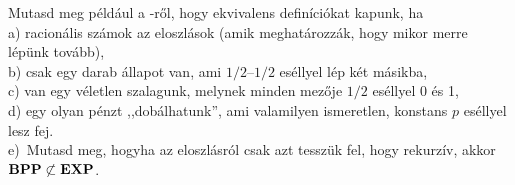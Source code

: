 \begin{Exercise}[counter={sorszam}, difficulty=0]
	Mutasd meg p\'eld\'aul a \BPP -r\H ol, hogy ekvivalens defin\'ici\'okat kapunk, ha\\
	a) racion\'alis sz\'amok az eloszl\'asok (amik meghat\'arozz\'ak, hogy mikor merre l\'ep\"unk tov\'abb),\\
	b) csak egy darab \'allapot van, ami $1/2$--$1/2$ es\'ellyel l\'ep k\'et m\'asikba,\\
	c) van egy v\'eletlen szalagunk, melynek minden mez\H oje $1/2$ es\'ellyel 0 \'es 1,\\
	d) egy olyan p\'enzt ,,dob\'alhatunk'', ami valamilyen ismeretlen, konstans $p$ es\'ellyel lesz fej.\\
	e)~\hard Mutasd meg, hogyha az eloszl\'asr\'ol csak azt tessz\"uk fel, hogy rekurz\'iv,
	akkor $\mbox{\ensuremath{\mathbf{BPP}}}\not\subset \mbox{\ensuremath{\mathbf{EXP}}}$.
\end{Exercise}	

